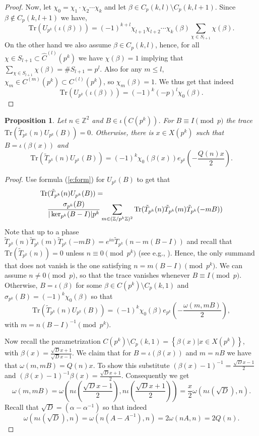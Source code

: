 \documentclass[12pt]{amsart}
\newtheorem{prop}[lem]{Proposition}
\theoremstyle{definition}
\theoremstyle{remark}
\numberwithin{equation}{section}
\newcommand{\set}[1]{\left\{#1\right\}}
\newcommand{\T}[1]{\tilde{T}_{#1}}
\newcommand{\bbZ}{\mathbb{Z}}
\newcommand{\Tr}{ \mbox{Tr}}
\begin{document}
\begin{proof}
Now, let $\chi_0=\chi_1\cdot\chi_2\cdots \chi_k$ and let $\beta\in
C_p(k,l)\setminus C_p(k,l+1)$. Since $\beta\not\in C_p(k,l+1)$ we
have,
\[\Tr(U_{p^k}(\iota(\beta)))=(-1)^{k+l}\chi_{l+1}\chi_{l+2}\cdots\chi_k(\beta)\sum_{\chi\in
S_{l+1}}\chi(\beta).\] On the other hand we also assume $\beta\in
C_p(k,l)$, hence, for all $\chi\in  S_{l+1}\subset \hat
C^{(l)}(p^k)$ we have $\chi(\beta)=1$ implying that $\sum_{\chi\in
S_{l+1}}\chi(\beta)=\# S_{l+1}=p^l$. Also for any $m\leq l$,
$\chi_m\in C^{(m)}(p^k)\subset C^{(l)}(p^k)$, so $\chi_m(\beta)=1$.
We thus get that indeed
\[\Tr(U_{p^k}(\iota(\beta)))=(-1)^k(-p)^l\chi_0(\beta).\]
\end{proof}


\begin{prop}\label{p:character}
Let $n\in\bbZ^2$ and $B \in \iota(C(p^k))$. For $B\equiv I\pmod{p}$
the trace $\Tr(\T{p^k}(n)U_{p^k}(B))=0$. Otherwise, there is $x\in
X(p^k)$ such that $B=\iota(\beta(x))$ and
\[\Tr(\T{p^k}(n)U_{p^k}(B))=(-1)^k
 \chi_0(\beta(x))e_{p^k}(-\frac{Q(n)x}{2}).\]
\end{prop}
\begin{proof}
Use formula (\ref{e:form}) for $U_{p^k}(B)$ to get that
\begin{eqnarray*}\lefteqn{\Tr(\T{p^k}(n)U_{p^k}(B))=}\\
&&\frac{\sigma_{p^k}(B)}{|\ker_{p^k}(B-I)|p^k}\sum_{m\in (\bbZ/p^k
\bbZ)^2}\Tr(\T{p^k}(n)\T{p^k}(m)\T{p^k}(-mB))
\end{eqnarray*}
Note that up to a phase
$\T{p^k}(n)\T{p^k}(m)\T{p^k}(-mB)=e^{i\alpha}\T{p^k}(n-m(B-I))$ and
recall that $\Tr(\T{p^k}(n))=0$ unless $n\equiv 0\pmod{p^k}$ (see
e.g., \cite[Lemma 4]{KurRud2000}). Hence, the only summand that does
not vanish is the one satisfying $n=m(B-I)\pmod {p^k}$. We can
assume $n\neq 0\pmod p$, so that the trace vanishes whenever
$B\equiv I\pmod{p}$. Otherwise, $B=\iota(\beta)$ for some $\beta\in
C(p^k)\setminus C_p(k,1)$ and $\sigma_{p^k}(B)=(-1)^k\chi_0(\beta)$
so that
\[\Tr(\T{p^k}(n)U_{p^k}(B))=(-1)^k\chi_0(\beta)e_{p^k}(-\frac{\omega(m,mB)}{2}),\]
with $m=n(B-I)^{-1}\pmod {p^k}$.

Now recall the parametrization $C(p^k)\setminus
C_p(k,1)=\set{\beta(x)|x\in X(p^k)}$, with
$\beta(x)=\frac{\sqrt{D}x+1}{\sqrt{D}x-1}$. We claim that for
$B=\iota(\beta(x))$ and $m=nB$ we have that $\omega(m,mB)=Q(n)x$. To
show this substitute $(\beta(x)-1)^{-1}=\frac{\sqrt{D}x-1}{2}$ and
$(\beta(x)-1)^{-1}\beta(x)=\frac{\sqrt{D}x+1}{2}$. Consequently we
get
\[\omega(m,mB)=\omega\left(n\iota(\frac{\sqrt{D}x-1}{2}),n\iota(\frac{\sqrt{D}x+1}{2})\right)=
\frac{x}{2}\omega(n\iota(\sqrt{D}),n).\] Recall that
$\sqrt{D}=(\alpha-\alpha^{-1})$ so that indeed
\[\omega(n\iota(\sqrt{D}),n)=\omega(n(A-A^{-1}),n)=2\omega(nA,n)=2Q(n).\]
\end{proof}
\end{document}
